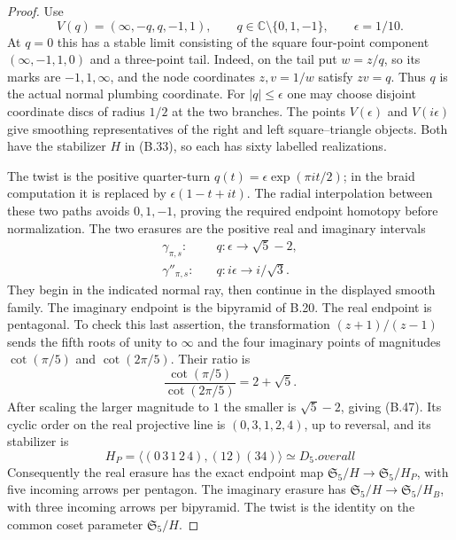 \begin{proof}
Use
\[
 V(q)=(\infty,-q,q,-1,1),\qquad
 q\in\mathbb C\setminus\{0,1,-1\},\qquad
 \epsilon=1/10.                                      \tag{B.46}
\]
At $q=0$ this has a stable limit consisting of the square
four-point component $(\infty,-1,1,0)$ and a three-point
tail.  Indeed, on the tail put $w=z/q$, so its marks are
$-1,1,\infty$, and the node coordinates $z,v=1/w$ satisfy
$zv=q$.  Thus $q$ is the actual normal plumbing coordinate.
For $|q|\leq\epsilon$ one may choose disjoint coordinate
discs of radius $1/2$ at the two branches.  The points
$V(\epsilon)$ and $V(i\epsilon)$ give smoothing
representatives of the right and left square--triangle
objects.  Both have the stabilizer $H$ in (B.33), so each
has sixty labelled realizations.

The twist is the positive quarter-turn
$q(t)=\epsilon\exp(\pi it/2)$; in the braid computation it
is replaced by
$\epsilon(1-t+it)$.  The radial interpolation between these
two paths avoids $0,1,-1$, proving the required endpoint
homotopy before normalization.  The two erasures are the
positive real and imaginary intervals
\[
\begin{split}
 \gamma_{\pi,s}:&\quad
  q:\epsilon\longrightarrow\sqrt5-2,\\
 \gamma''_{\pi,s}:&\quad
  q:i\epsilon\longrightarrow i/\sqrt3.
\end{split}                                                     \tag{B.47}
\]
They begin in the indicated normal ray, then continue
in the displayed smooth family.  The imaginary endpoint
is the bipyramid of B.20.  The real endpoint is pentagonal.
To check this last assertion, the transformation
$(z+1)/(z-1)$ sends the fifth roots of unity to $\infty$
and the four imaginary points of magnitudes
$\cot(\pi/5)$ and $\cot(2\pi/5)$.  Their ratio is
\[
 \frac{\cot(\pi/5)}{\cot(2\pi/5)}=2+\sqrt5.
\]
After scaling the larger magnitude to $1$ the smaller
is $\sqrt5-2$, giving (B.47).  Its cyclic order on the
real projective line is $(0,3,1,2,4)$, up to reversal,
and its stabilizer is
\[
 H_P=\langle(0\,3\,1\,2\,4),(12)(34)\rangle\simeq D_5.

overall\tag{B.48}
\]
Consequently the real erasure has the exact endpoint map
$\mathfrak S_5/H\to\mathfrak S_5/H_P$, with five incoming
arrows per pentagon.  The imaginary erasure has
$\mathfrak S_5/H\to\mathfrak S_5/H_B$, with three incoming
arrows per bipyramid.  The twist is the identity on the
common coset parameter $\mathfrak S_5/H$.


\end{proof}

